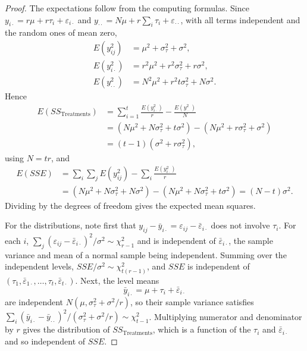 \documentclass[11pt,a4paper]{article}
\numberwithin{equation}{section}
\theoremstyle{definition}
\begin{document}
\begin{proof}
The expectations follow from the computing formulas. Since $y_{i\cdot} = r\mu + r\tau_i + \varepsilon_{i\cdot}$ and $y_{\cdot\cdot} = N\mu + r\sum_i\tau_i + \varepsilon_{\cdot\cdot}$, with all terms independent and the random
ones of mean zero,
\begin{align*}
E(y_{ij}^2) &= \mu^2 + \sigma^2_\tau + \sigma^2 , \\
E(y_{i\cdot}^2) &= r^2\mu^2 + r^2\sigma^2_\tau + r\sigma^2 , \\
E(y_{\cdot\cdot}^2) &= N^2\mu^2 + r^2t\sigma^2_\tau + N\sigma^2 .
\end{align*}
Hence
\begin{align*}
E(SS_{\mathrm{Treatments}}) &= \sum_{i=1}^t\frac{E(y_{i\cdot}^2)}r - \frac{E(y_{\cdot\cdot}^2)}N \\
&= (N\mu^2 + N\sigma^2_\tau + t\sigma^2) - (N\mu^2 + r\sigma^2_\tau + \sigma^2) \\
&= (t - 1)(\sigma^2 + r\sigma^2_\tau) ,
\end{align*}
using $N = tr$, and
\begin{align*}
E(SSE) &= \sum_i\sum_jE(y_{ij}^2) - \sum_i\frac{E(y_{i\cdot}^2)}r \\
&= (N\mu^2 + N\sigma^2_\tau + N\sigma^2) - (N\mu^2 + N\sigma^2_\tau + t\sigma^2) = (N - t)\sigma^2 .
\end{align*}
Dividing by the degrees of freedom gives the expected mean squares.

For the distributions, note first that $y_{ij} - \bar y_{i\cdot} = \varepsilon_{ij} - \bar\varepsilon_{i\cdot}$ does not involve $\tau_i$. For each $i$, $\sum_j(\varepsilon_{ij} - \bar\varepsilon_{i\cdot})^2/\sigma^2 \sim \chi^2_{r-1}$ and is
independent of $\bar\varepsilon_{i\cdot}$, the sample variance and mean of a normal sample being independent. Summing over the independent levels,
$SSE/\sigma^2 \sim \chi^2_{t(r-1)}$, and $SSE$ is independent of $(\tau_1, \bar\varepsilon_{1\cdot}, \dots, \tau_t, \bar\varepsilon_{t\cdot})$. Next, the level means
\[
\bar y_{i\cdot} = \mu + \tau_i + \bar\varepsilon_{i\cdot}
\]
are independent $N(\mu, \sigma^2_\tau + \sigma^2/r)$, so their sample variance satisfies $\sum_i(\bar y_{i\cdot} - \bar y_{\cdot\cdot})^2/(\sigma^2_\tau + \sigma^2/r) \sim \chi^2_{t-1}$. Multiplying numerator and
denominator by $r$ gives the distribution of $SS_{\mathrm{Treatments}}$, which is a function of the $\tau_i$ and $\bar\varepsilon_{i\cdot}$ and so independent of $SSE$.
\end{proof}
\end{document}
